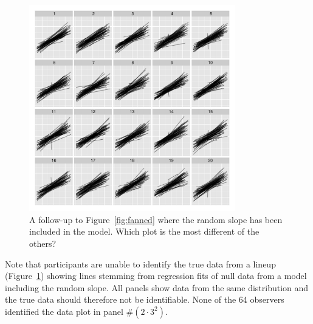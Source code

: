 \documentclass[12pt]{article} %
\newcommand{\alnote}[1]{\todo[inline,color=green!40]{#1}} %
\newcommand{\hhnote}[1]{\todo[inline,color=orange!40]{#1}}
\begin{document}
\begin{figure}
	\centering
	\includegraphics[width = 0.8\textwidth]{normexam_fanned_withslope_lineup18}
	\caption{\label{fig:fanned2} A follow-up to Figure~\ref{fig:fanned} where the random slope has been included in the model. Which plot is the most different of the others?}
\end{figure}

%

{Note that participants are unable to identify the true data from a lineup (Figure~\ref{fig:fanned2}) showing lines stemming from regression fits of null data from a model including the random slope.  All panels show data from the same distribution and the true data should therefore not be identifiable.  None of the 64 observers identified the data plot in panel \#$(2\cdot 3^2)$. }
\end{document}
